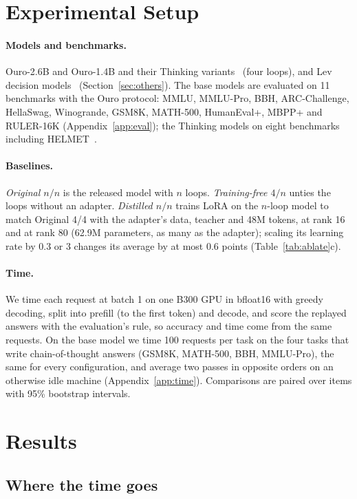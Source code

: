 \documentclass[11pt]{article}
\begin{document}
\section{Experimental Setup}
\label{sec:setup}

\paragraph{Models and benchmarks.} Ouro-2.6B and Ouro-1.4B and their Thinking variants~\citep{ouro} (four loops), and
Lev decision models~\citep{lev} (Section~\ref{sec:others}). The base models are evaluated on 11 benchmarks with the Ouro
protocol: MMLU, MMLU-Pro, BBH, ARC-Challenge, HellaSwag, Winogrande, GSM8K, MATH-500, HumanEval+, MBPP+ and RULER-16K
(Appendix~\ref{app:eval}); the Thinking models on eight benchmarks including HELMET~\citep{helmet}.

\paragraph{Baselines.} \emph{Original $n/n$} is the released model with $n$ loops. \emph{Training-free $4/n$} unties
the loops without an adapter. \emph{Distilled $n/n$} trains LoRA on the $n$-loop model to match Original 4/4 with the
adapter's data, teacher and 48M tokens, at rank 16 and at rank 80 (62.9M parameters, as many as the adapter); scaling
its learning rate by 0.3 or 3 changes its average by at most 0.6 points (Table~\ref{tab:ablate}c).

\paragraph{Time.} We time each request at batch 1 on one B300 GPU in bfloat16 with greedy decoding, split into prefill
(to the first token) and decode, and score the replayed answers with the evaluation's rule, so accuracy and time come
from the same requests. On the base model we time 100 requests per task on the four tasks that write chain-of-thought
answers (GSM8K, MATH-500, BBH, MMLU-Pro), the same for every configuration, and average two passes in opposite orders
on an otherwise idle machine (Appendix~\ref{app:time}). Comparisons are paired over items with 95\% bootstrap
intervals.

\section{Results}
\label{sec:results}

\subsection{Where the time goes}
\label{sec:time}
\end{document}
